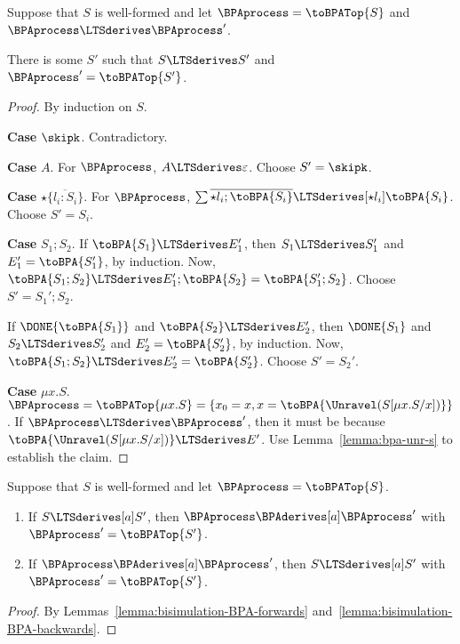 \begin{lemma}\label{lemma:app:bisimulation-BPA-backwards}
  Suppose that $S$ is well-formed and let $\BPAprocess = \toBPATop{S}$
  and $\BPAprocess \LTSderives \BPAprocess'$.

  There is some $S'$ such that $S \LTSderives S'$ and $\BPAprocess' = \toBPATop{S'}$.
\end{lemma}
\begin{proof}
  By induction on $S$.

  \textbf{Case }$\skipk$. Contradictory.

  \textbf{Case }$A$. For $\BPAprocess$, ${A \LTSderives \varepsilon
  }$. Choose $S' = \skipk$.

  \textbf{Case }$\star\{\overline{l_i:S_i}\}$. For $\BPAprocess$,
  ${\sum \overline{\star l_i; \toBPA{S_i}} \LTSderives[\star l_i]
    \toBPA{S_i} }$. Choose $S' = S_i$.

  \textbf{Case }$S_1;S_2$.
  If $\toBPA{S_1} \LTSderives E_1'$,
  then $S_1 \LTSderives S_1'$ and $E_1' = \toBPA{S_1'}$, by induction.
  Now, $\toBPA{S_1;S_2} \LTSderives E_1'; \toBPA{S_2} = \toBPA{S_1';
    S_2}$. Choose $S' = S_1';S_2$.

  If $\DONE{\toBPA{S_1}}$ and $\toBPA{S_2} \LTSderives E_2'$,
  then $\DONE{S_1}$ and $S_2 \LTSderives S_2'$ and $E_2' =
  \toBPA{S_2'}$, by induction. Now, $\toBPA{S_1;S_2} \LTSderives E_2' = \toBPA{S_2'}$. Choose $S' = S_2'$.

  \textbf{Case }$\mu x.S$.
  $\BPAprocess = \toBPATop{\mu x.S} = \{ x_0 = x, x = \toBPA{\Unravel
    (S[\mu x. S/x])} \}$. If $\BPAprocess \LTSderives \BPAprocess'$,
  then it must be because $\toBPA{\Unravel
    (S[\mu x. S/x])} \LTSderives E'$. Use Lemma~\ref{lemma:bpa-unr-s}
  to establish the claim.
\end{proof}

\begin{theorem}
  Suppose that $S$ is well-formed and let $\BPAprocess = \toBPATop{S}$.
  \begin{enumerate}
  \item If $ S \LTSderives[a] S'$, then $\BPAprocess \BPAderives[a]
    \BPAprocess'$ with $\BPAprocess' = \toBPATop{S'}$.
  \item If $\BPAprocess \BPAderives[a] \BPAprocess'$, then $S
    \LTSderives[a] S'$ with  $\BPAprocess' = \toBPATop{S'}$.
  \end{enumerate}
\end{theorem}
\begin{proof}
  By Lemmas~\ref{lemma:bisimulation-BPA-forwards} and~\ref{lemma:bisimulation-BPA-backwards}.
\end{proof}

